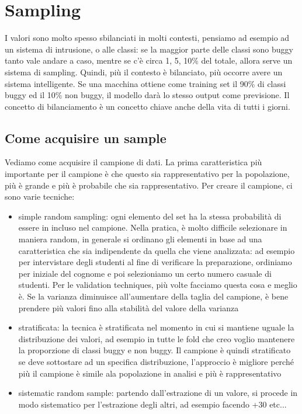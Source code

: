 \documentclass{article}
\begin{document}
\section{Sampling}
I valori sono molto spesso sbilanciati in molti contesti, pensiamo ad esempio ad un sistema di intrusione, o alle classi: se la maggior parte delle classi sono buggy tanto vale andare a caso, mentre se c'è circa 1, 5, 10\% del totale, allora serve un sistema di sampling. Quindi, più il contesto è bilanciato, più occorre avere un sistema intelligente. Se una macchina ottiene come training set il 90\% di classi buggy ed il 10\% non buggy, il modello darà lo stesso output come previsione. Il concetto di bilanciamento è un concetto chiave anche della vita di tutti i giorni.
\subsection{Come acquisire un sample}
Vediamo come acquisire il campione di dati. La prima caratteristica più importante per il campione è che questo sia rappresentativo per la popolazione, più è grande e più è probabile che sia rappresentativo. Per creare il campione, ci sono varie tecniche:
\begin{itemize}
\item simple random sampling: ogni elemento del set ha la stessa probabilità di essere in incluso nel campione. Nella pratica, è molto difficile selezionare in maniera random, in generale si ordinano gli elementi in base ad una caratteristica che sia indipendente da quella che viene analizzata: ad esempio per intervistare degli studenti al fine di verificare la preparazione, ordiniamo per iniziale del cognome e poi selezioniamo un certo numero casuale di studenti. Per le validation techniques, più volte facciamo questa cosa e meglio è. Se la varianza diminuisce all'aumentare della taglia del campione, è bene prendere più valori fino alla stabilità del valore della varianza
\item stratificata: la tecnica è stratificata nel momento in cui si mantiene uguale la distribuzione dei valori, ad esempio in tutte le fold che creo voglio mantenere la proporzione di classi buggy e non buggy. Il campione è quindi stratificato se deve sottostare ad un specifica distribuzione, l'approccio è migliore perché più il campione è simile ala popolazione in analisi e più è rappresentativo
\item sistematic random sample: partendo dall'estrazione di un valore, si procede in modo sistematico per l'estrazione degli altri, ad esempio facendo +30 etc...
\end{itemize}
\end{document}
